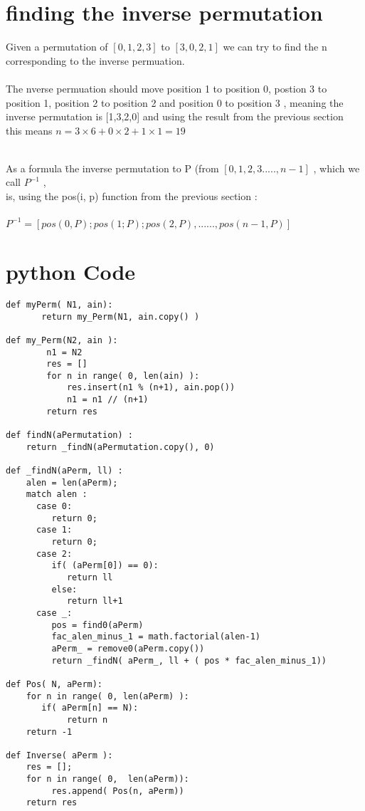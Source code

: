 \documentclass{article} %
\begin{document}
\section{finding the inverse permutation}
\text
Given a permutation of   \(  [ 0, 1, 2, 3] \) to \(  [3, 0, 2, 1] \)  we can try to find the n corresponding to the  inverse permuation.
\\
\\
The nverse permuation should  move position 1 to  position 0, postion 3 to  position 1, position 2 to  position 2 and position 0 to  position 3 , 
meaning the inverse permutation is [1,3,2,0]  and using the result from the previous section
\\
this means \( n = 3 \times 6 +  0 \times 2 + 1 \times 1 = 19 \)
\\
\\
\begin{tabbing}
As a formula \= the inverse permutation to P (from \(  [0,1,2,3.....,n-1] \) , which we call  \( P^{-1} \) , 
\\
is,  using the pos(i, p) function from the previous section :
\\
\\
\> \( P^{-1} =  [ pos(0,P); pos(1;P); pos(2,P),......,pos(n-1,P)] \)
\end{tabbing}
\newpage 
  \section{python Code} %
\begin{lstlisting}
def myPerm( N1, ain):  
	   return my_Perm(N1, ain.copy() )
	   
def my_Perm(N2, ain ):
		n1 = N2
		res = []
		for n in range( 0, len(ain) ):
			res.insert(n1 % (n+1), ain.pop())
			n1 = n1 // (n+1)
		return res

def findN(aPermutation) :
    return _findN(aPermutation.copy(), 0)
			
def _findN(aPerm, ll) :
    alen = len(aPerm);
    match alen :
      case 0: 
         return 0;	  		
      case 1:	
         return 0;
      case 2:	
         if( (aPerm[0]) == 0):
            return ll
         else:
            return ll+1	  				
      case _:	
         pos = find0(aPerm)
         fac_alen_minus_1 = math.factorial(alen-1)
         aPerm_ = remove0(aPerm.copy())
         return _findN( aPerm_, ll + ( pos * fac_alen_minus_1))

def Pos( N, aPerm):
    for n in range( 0, len(aPerm) ):
       if( aPerm[n] == N):
            return n
    return -1 
    
def Inverse( aPerm ):
    res = [];
    for n in range( 0,  len(aPerm)):
         res.append( Pos(n, aPerm)) 	  
    return res
\end{lstlisting}
\newpage
\end{document}
